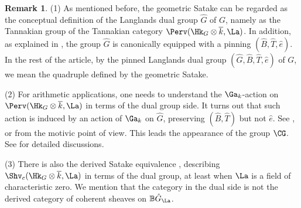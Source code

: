 \documentclass[11pt]{amsart}
\theoremstyle{definition}
\theoremstyle{definition}
\newtheorem{rmk}[thm]{Remark}
\theoremstyle{definition}
\numberwithin{equation}{section}
\newcommand{\bB}{{\mathbb B}}
\begin{document}
\begin{rmk}
\label{R: birth of the dual group}
(1) As mentioned before, the geometric Satake can be regarded as the conceptual definition of the Langlands dual group $\hat G$ of $G$, namely as the Tannakian group of the Tannakian category $\Perv(\Hk_G\otimes \overline k,\La)$. In addition, as explained in \cite{Yun-Zhu-Integral-Homology, Zhu-Ramified-Sat}, the group $\hat G$ is canonically equipped with a pinning $(\hat B, \hat T, \hat e)$. In the rest of the article, by the pinned Langlands dual group $(\hat{G},\hat{B},\hat{T},\hat{e})$ of $G$, we mean the quadruple defined by the geometric Satake.

(2) For arithmetic applications, one needs to understand the $\Ga_k$-action on $\Perv(\Hk_G\otimes\overline k,\La)$ in terms of the dual group side.  It turns out that such action is induced by an action of $\Ga_k$ on $\hat{G}$, preserving $(\hat{B},\hat{T})$ but not $\hat{e}$. See \cite{Zhu-Ramified-Sat, Zhu-PCMI}, or \cite{Zhu-CDM} from the motivic point of view. This leads the appearance of the group $\CG$. See \cite{Zhu-Ramified-Sat, Zhu-PCMI, Zhu-Integral-Satake} for detailed discussions.

(3) There is also  the derived Satake equivalence \cite{Bezrukavnikov-Finkelberg-Derived-Satake}, describing $\Shv_{c}(\Hk_G\otimes\overline k,\La)$ in terms of the dual group, at least when $\La$ is a field of characteristic zero. We mention that the category in the dual side is not the derived category of coherent sheaves on $\bB\hat{G}_\La$.


\end{rmk}
\end{document}
